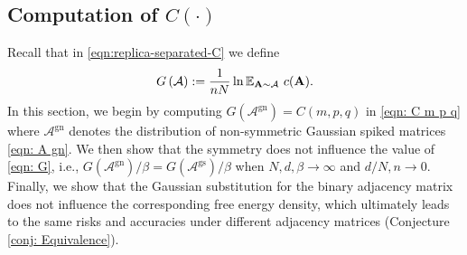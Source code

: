 \documentclass[9pt,twocolumn]{pnas-new}
\begin{document}
\subsection{Computation of $C(\cdot)$}\label{APP: C}
Recall that in \eqref{eqn:replica-separated-C} we define
\begin{equation}\label{eqn: G}
    G\left(\mathcal{A}\right):=\frac{1}{nN}\ln \mathbb{E}_{\mathbf{A} \sim \mathcal{A}} ~ c(\mathbf{A}).
\end{equation}
In this section, we begin by computing $G(\mathcal{A}^{\text{gn}})=C(m,p,q)$ in \eqref{eqn: C m p q} where $\mathcal{A}^{\text{gn}}$ denotes the distribution of non-symmetric Gaussian spiked matrices \eqref{eqn: A gn}.  We then show that the symmetry does not influence the value of \eqref{eqn: G}, i.e., $G(\mathcal{A}^{\text{gn}})/{\beta}=G(\mathcal{A}^{\text{gs}})/{\beta}$ when $N,d,\beta \to \infty$ and $d/N,n \to 0$. Finally, we show that the Gaussian substitution for the binary adjacency matrix does not influence the corresponding free energy density, which ultimately leads to the same risks and accuracies under different adjacency matrices (Conjecture \ref{conj: Equivalence}).

\end{document}
